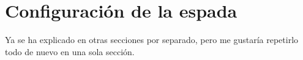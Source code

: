 \section{Configuración de la espada}

Ya se ha explicado en otras secciones por separado, pero me gustaría repetirlo todo de nuevo en una sola sección.

\blindtext